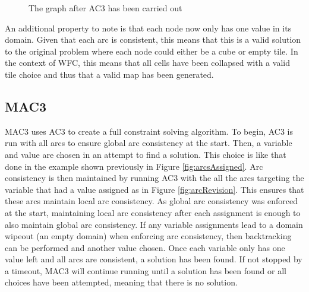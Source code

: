 \begin{figure}[H]
    \centering
    
    \caption{The graph after AC3 has been carried out}
    \label{fig:arcsRevised2}
\end{figure}

An additional property to note is that each node now only has one value in its domain. Given that each arc is consistent, this means that this is a valid solution to the original problem where each node could either be a cube or empty tile. In the context of WFC, this means that all cells have been collapsed with a valid tile choice and thus that a valid map has been generated.

\subsection{MAC3}
MAC3 uses AC3 to create a full constraint solving algorithm. To begin, AC3 is run with all arcs to ensure global arc consistency at the start. Then, a variable and value are chosen in an attempt to find a solution. This choice is like that done in the example shown previously in Figure \ref{fig:arcsAssigned}. Arc consistency is then maintained by running AC3 with the all the arcs targeting the variable that had a value assigned as in Figure \ref{fig:arcRevision}. This ensures that these arcs maintain local arc consistency. As global arc consistency was enforced at the start, maintaining local arc consistency after each assignment is enough to also maintain global arc consistency. If any variable assignments lead to a domain wipeout (an empty domain) when enforcing arc consistency, then backtracking can be performed and another value chosen. Once each variable only has one value left and all arcs are consistent, a solution has been found. If not stopped by a timeout, MAC3 will continue running until a solution has been found or all choices have been attempted, meaning that there is no solution.

